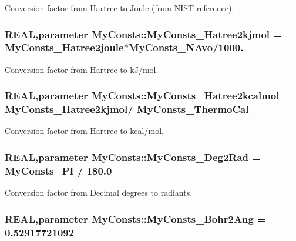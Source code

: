 Conversion factor from Hartree to Joule (from NIST reference). \hypertarget{namespace_my_consts_a52c584174f4239e0fc306f998e2ea995}{
\subsubsection[{MyConsts\_\-Hatree2kjmol}]{\setlength{\rightskip}{0pt plus 5cm}REAL,parameter {\bf MyConsts::MyConsts\_\-Hatree2kjmol} = {\bf MyConsts\_\-Hatree2joule}$\ast${\bf MyConsts\_\-NAvo}/1000.}}
\label{namespace_my_consts_a52c584174f4239e0fc306f998e2ea995}


Conversion factor from Hartree to kJ/mol. \hypertarget{namespace_my_consts_a10bc4f3baa41b52bdf26dc261a49bcf7}{
\subsubsection[{MyConsts\_\-Hatree2kcalmol}]{\setlength{\rightskip}{0pt plus 5cm}REAL,parameter {\bf MyConsts::MyConsts\_\-Hatree2kcalmol} = {\bf MyConsts\_\-Hatree2kjmol}/ {\bf MyConsts\_\-ThermoCal}}}
\label{namespace_my_consts_a10bc4f3baa41b52bdf26dc261a49bcf7}


Conversion factor from Hartree to kcal/mol. \hypertarget{namespace_my_consts_ac63452d39765e7e679949322436dfb08}{
\subsubsection[{MyConsts\_\-Deg2Rad}]{\setlength{\rightskip}{0pt plus 5cm}REAL,parameter {\bf MyConsts::MyConsts\_\-Deg2Rad} = {\bf MyConsts\_\-PI} / 180.0}}
\label{namespace_my_consts_ac63452d39765e7e679949322436dfb08}


Conversion factor from Decimal degrees to radiants. \hypertarget{namespace_my_consts_a5fc835991a4a417c2bdf1226c1ba2b3a}{
\subsubsection[{MyConsts\_\-Bohr2Ang}]{\setlength{\rightskip}{0pt plus 5cm}REAL,parameter {\bf MyConsts::MyConsts\_\-Bohr2Ang} = 0.52917721092}}
\label{namespace_my_consts_a5fc835991a4a417c2bdf1226c1ba2b3a}


